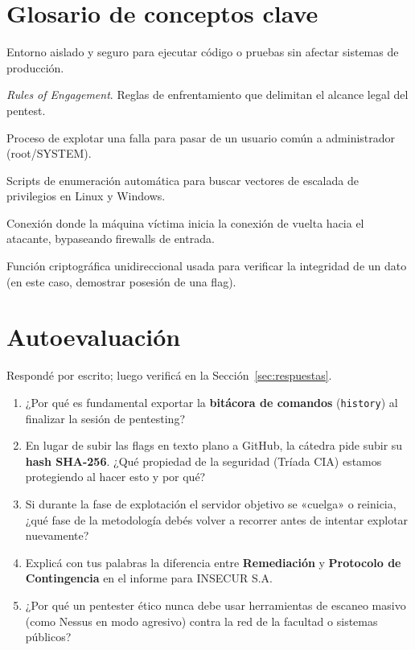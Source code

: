 \documentclass[11pt,a4paper]{article}
\begin{document}
\section{Glosario de conceptos clave}
\begin{description}[leftmargin=!, labelwidth=3.5cm, font=\bfseries]
  \item[Sandbox] Entorno aislado y seguro para ejecutar código o pruebas sin afectar sistemas de producción.
  \item[ROE] \textit{Rules of Engagement}. Reglas de enfrentamiento que delimitan el alcance legal del pentest.
  \item[Escalada de Privilegios] Proceso de explotar una falla para pasar de un usuario común a administrador (root/SYSTEM).
  \item[LinPEAS / WinPEAS] Scripts de enumeración automática para buscar vectores de escalada de privilegios en Linux y Windows.
  \item[Reverse Shell] Conexión donde la máquina víctima inicia la conexión de vuelta hacia el atacante, bypaseando firewalls de entrada.
  \item[Hash SHA-256] Función criptográfica unidireccional usada para verificar la integridad de un dato (en este caso, demostrar posesión de una flag).
\end{description}

\section{Autoevaluación}\label{sec:autoeval}
Respondé por escrito; luego verificá en la Sección~\ref{sec:respuestas}.

\begin{enumerate}[leftmargin=*]
  \item ¿Por qué es fundamental exportar la \textbf{bitácora de comandos} (\texttt{history}) al finalizar la sesión de pentesting?
  \item En lugar de subir las flags en texto plano a GitHub, la cátedra pide subir su \textbf{hash SHA-256}. ¿Qué propiedad de la seguridad (Tríada CIA) estamos protegiendo al hacer esto y por qué?
  \item Si durante la fase de explotación el servidor objetivo se «cuelga» o reinicia, ¿qué fase de la metodología debés volver a recorrer antes de intentar explotar nuevamente?
  \item Explicá con tus palabras la diferencia entre \textbf{Remediación} y \textbf{Protocolo de Contingencia} en el informe para INSECUR S.A.
  \item ¿Por qué un pentester ético nunca debe usar herramientas de escaneo masivo (como Nessus en modo agresivo) contra la red de la facultad o sistemas públicos?
\end{enumerate}
\end{document}
